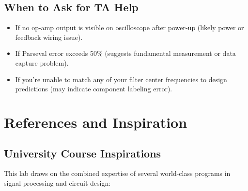 \documentclass[11pt,letterpaper]{article}
\begin{document}
\subsection*{When to Ask for TA Help}

\begin{itemize}
    \item If no op-amp output is visible on oscilloscope after power-up (likely power or feedback wiring issue).
    \item If Parseval error exceeds 50\% (suggests fundamental measurement or data capture problem).
    \item If you're unable to match any of your filter center frequencies to design predictions (may indicate component labeling error).
\end{itemize}

\clearpage

\section*{References and Inspiration}

\subsection*{University Course Inspirations}

This lab draws on the combined expertise of several world-class programs in signal processing and circuit design:
\end{document}
